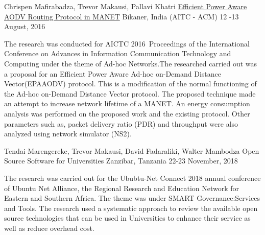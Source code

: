 \begin{cventries}

  \cventry
    {Chrispen Mafirabadza, Trevor Makausi, Pallavi Khatri} %
    {\href{https://dl.acm.org/citation.cfm?id=2979831}{Efficient Power Aware AODV Routing Protocol in MANET}\articleLink} %
    {Bikaner, India (AITC - ACM)} %
    {12 -13 August, 2016} %
    {
      \begin{cvitems} %
        \item {The research was conducted for AICTC 2016 Proceedings of the International Conference on Advances in Information Communication Technology and Computing under the theme of Ad-hoc Networks.The researched carried out was a proposal for an Efficient Power Aware Ad-hoc on-Demand Distance Vector(EPAAODV) protocol. This is a modification of the normal functioning of the Ad-hoc on-Demand Distance Vector protocol. The proposed technique made an attempt to increase network lifetime of a MANET. An energy consumption analysis was performed on the proposed work and the existing protocol. Other parameters such as, packet delivery ratio (PDR) and throughput
        were also analyzed using network simulator (NS2).} 
      \end{cvitems}
    }

  \cventry
    {Tendai Marengereke, Trevor Makausi, David Fadaraliki, Walter Mambodza} %
    { Open Source Software for Universities} %
    {Zanzibar, Tanzania} %
    {22-23 November, 2018} %
    {
      \begin{cvitems} %
        \item {The research was carried out for the Ububtu-Net Connect 2018 annual conference of Ubuntu Net Alliance, the Regional Research and Education Network for Eastern and Southern Africa. The theme was under SMART Governance:Services and Tools. The research used a systematic approach to review the available open source technologies that can be used in Universities to enhance their service as well as reduce overhead cost.}
      \end{cvitems}
    }


\end{cventries}
